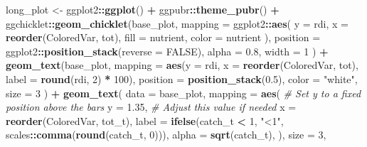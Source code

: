 \documentclass[
]{book}
\newenvironment{Shaded}{\begin{snugshade}}{\end{snugshade}}
\newcommand{\AttributeTok}[1]{\textcolor[rgb]{0.13,0.29,0.53}{#1}}
\newcommand{\CommentTok}[1]{\textcolor[rgb]{0.56,0.35,0.01}{\textit{#1}}}
\newcommand{\ConstantTok}[1]{\textcolor[rgb]{0.56,0.35,0.01}{#1}}
\newcommand{\DecValTok}[1]{\textcolor[rgb]{0.00,0.00,0.81}{#1}}
\newcommand{\FloatTok}[1]{\textcolor[rgb]{0.00,0.00,0.81}{#1}}
\newcommand{\FunctionTok}[1]{\textcolor[rgb]{0.13,0.29,0.53}{\textbf{#1}}}
\newcommand{\NormalTok}[1]{#1}
\newcommand{\OtherTok}[1]{\textcolor[rgb]{0.56,0.35,0.01}{#1}}
\newcommand{\SpecialCharTok}[1]{\textcolor[rgb]{0.81,0.36,0.00}{\textbf{#1}}}
\newcommand{\StringTok}[1]{\textcolor[rgb]{0.31,0.60,0.02}{#1}}
\begin{document}
\begin{Shaded}
\begin{Highlighting}[]
\NormalTok{long\_plot }\OtherTok{\textless{}{-}}
\NormalTok{ggplot2}\SpecialCharTok{::}\FunctionTok{ggplot}\NormalTok{() }\SpecialCharTok{+}
\NormalTok{  ggpubr}\SpecialCharTok{::}\FunctionTok{theme\_pubr}\NormalTok{() }\SpecialCharTok{+}
\NormalTok{  ggchicklet}\SpecialCharTok{::}\FunctionTok{geom\_chicklet}\NormalTok{(base\_plot,}
                            \AttributeTok{mapping =}\NormalTok{ ggplot2}\SpecialCharTok{::}\FunctionTok{aes}\NormalTok{(}
                              \AttributeTok{y =}\NormalTok{ rdi, }\AttributeTok{x =} \FunctionTok{reorder}\NormalTok{(ColoredVar, tot),}
                              \AttributeTok{fill =}\NormalTok{ nutrient,}
                              \AttributeTok{color =}\NormalTok{ nutrient}
\NormalTok{                            ),}
                            \AttributeTok{position =}\NormalTok{ ggplot2}\SpecialCharTok{::}\FunctionTok{position\_stack}\NormalTok{(}\AttributeTok{reverse =} \ConstantTok{FALSE}\NormalTok{),}
                            \AttributeTok{alpha =} \FloatTok{0.8}\NormalTok{,}
                            \AttributeTok{width =} \DecValTok{1}
\NormalTok{  ) }\SpecialCharTok{+}
  \FunctionTok{geom\_text}\NormalTok{(base\_plot,}
            \AttributeTok{mapping =} \FunctionTok{aes}\NormalTok{(}\AttributeTok{y =}\NormalTok{ rdi, }\AttributeTok{x =} \FunctionTok{reorder}\NormalTok{(ColoredVar, tot), }\AttributeTok{label =} \FunctionTok{round}\NormalTok{(rdi, }\DecValTok{2}\NormalTok{) }\SpecialCharTok{*} \DecValTok{100}\NormalTok{),}
            \AttributeTok{position =} \FunctionTok{position\_stack}\NormalTok{(}\FloatTok{0.5}\NormalTok{),}
            \AttributeTok{color =} \StringTok{"white"}\NormalTok{,}
            \AttributeTok{size =} \DecValTok{3}
\NormalTok{  ) }\SpecialCharTok{+}
  \FunctionTok{geom\_text}\NormalTok{(}
    \AttributeTok{data =}\NormalTok{ base\_plot,}
    \AttributeTok{mapping =} \FunctionTok{aes}\NormalTok{(}
      \CommentTok{\# Set y to a fixed position above the bars}
      \AttributeTok{y =} \FloatTok{1.35}\NormalTok{,  }\CommentTok{\# Adjust this value if needed}
      \AttributeTok{x =} \FunctionTok{reorder}\NormalTok{(ColoredVar, tot\_t),}
      \AttributeTok{label =} \FunctionTok{ifelse}\NormalTok{(catch\_t }\SpecialCharTok{\textless{}} \DecValTok{1}\NormalTok{, }\StringTok{"\textless{}1"}\NormalTok{, scales}\SpecialCharTok{::}\FunctionTok{comma}\NormalTok{(}\FunctionTok{round}\NormalTok{(catch\_t, }\DecValTok{0}\NormalTok{))),}
      \AttributeTok{alpha =} \FunctionTok{sqrt}\NormalTok{(catch\_t),}
\NormalTok{    ),}
    \AttributeTok{size =} \DecValTok{3}\NormalTok{,}

\end{Highlighting}
\end{Shaded}
\end{document}
